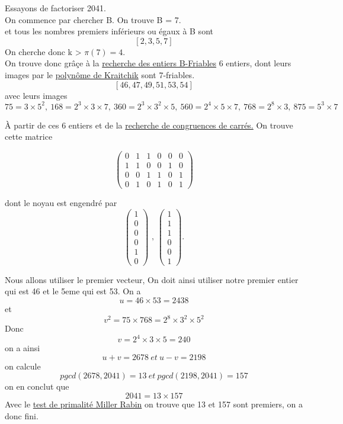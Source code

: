 \begin{example}
    Essayons de factoriser 2041.\\
    On commence par chercher B. On trouve B = 7.\\
    et tous les nombres premiers inférieurs ou égaux à B sont
    \[[2, 3, 5, 7]\]
    On cherche donc k > $\pi(7) = 4$. \\
    On trouve donc grâçe à la \hyperref[B-friabilite]{recherche des entiers B-Friables} 6 entiers, dont leurs images par le \hyperref[polynome de Kraitchik]{polynôme de Kraitchik} sont 7-friables.
    \[[46, 47, 49, 51, 53, 54]\]
    avec leurs images
    \[75 = 3 \times 5^2, ~ 168 = 2^3 \times 3 \times 7, ~ 360 = 2^3 \times 3^2 \times 5, ~ 560 = 2^4 \times 5 \times 7, ~ 768 = 2^8 \times 3, ~ 875 = 5^3 \times 7\]

    À partir de ces 6 entiers et de la \hyperref[Matrices]{recherche de congruences de carrés.}
    On trouve cette matrice

    \[\begin{pmatrix}
    0 & 1 & 1 & 0 & 0 & 0\\
    1 & 1 & 0 & 0 & 1 & 0\\
    0 & 0 & 1 & 1 & 0 & 1\\
    0 & 1 & 0 & 1 & 0 & 1
    \end{pmatrix}\]

    dont le noyau est engendré par
    \[\begin{pmatrix} 1\\ 0\\ 0\\ 0\\ 1\\ 0\end{pmatrix} \textrm{ , } \begin{pmatrix} 1\\ 1\\ 1\\ 0\\ 0\\ 1\end{pmatrix}\textrm{.}\]

    Nous allons utiliser le premier vecteur, On doit ainsi utiliser notre premier entier qui est 46 et le 5eme qui est 53.
    On a \[u = 46 \times 53 = 2438\]
    et \[v^2 = 75 \times 768 = 2^8 \times 3^2 \times 5^2\]
    Donc \[v = 2^4 \times 3 \times 5 = 240\]
    on a ainsi \[u + v = 2678 ~ et ~ u - v = 2198\]
    on calcule \[pgcd(2678, 2041) = 13 ~ et ~ pgcd(2198, 2041) = 157\]
    on en conclut que \[2041 = 13 \times 157\]
    Avec le \hyperref[Miller_Rabin]{test de primalité Miller Rabin} on trouve que 13 et 157 sont premiers, on a donc fini.
\end{example}
